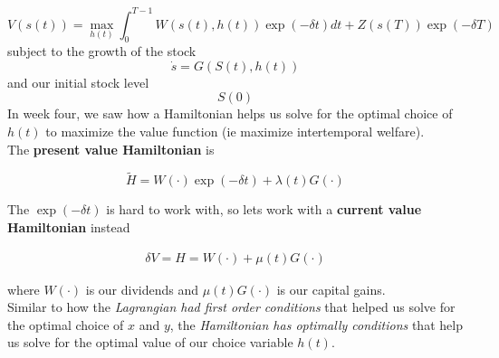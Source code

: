 \documentclass{article}
\begin{document}
$$V(s(t)) = \max_{h(t)} \int_0^{T-1} W(s(t), h(t))\exp(-\delta t) dt + Z(s(T)) \exp(-\delta T)$$
subject to the growth of the stock 
$$\dot s = G(S(t), h(t)) $$
and our initial stock level
$$S(0)$$
In week four, we saw how a Hamiltonian helps us solve for the optimal choice of $h(t)$ to maximize the value function (ie maximize intertemporal welfare). \\

The \textbf{present value Hamiltonian} is 

$$\tilde{H} = W(\cdot)\exp(-\delta t) + \lambda(t) G(\cdot) $$

The $\exp(-\delta t)$ is hard to work with, so lets work with a \textbf{current value Hamiltonian} instead

\begin{align}
    \delta V =H = W(\cdot)+ \mu(t) G(\cdot) 
    \label{cvh}
\end{align}

where $W(\cdot)$ is our dividends and $\mu(t) G(\cdot) $ is our capital gains. \\

Similar to how the \textit{Lagrangian had first order conditions} that helped us solve for the optimal choice of $x$ and $y$, the \textit{Hamiltonian has optimally conditions} that help us solve for the optimal value of our choice variable $h(t)$. \\
\end{document}
